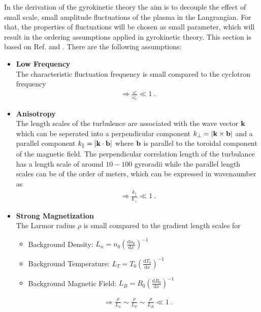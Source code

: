 In the derivation of the gyrokinetic theory the aim is to decouple the effect of small scale, small amplitude fluctuations of the plasma in the Langrangian. For that, the properties of fluctuations will be chosen as small parameter, which will result in the ordering assumptions applied in gyrokinetic theory. This section is based on Ref.   and . There are the following assumptions:

\begin{itemize}
	\item \textbf{Low Frequency}\\
		The characteristic fluctuation frequency is small compared to the cyclotron frequency 
		\begin{gather*}
			\Rightarrow \frac{\omega}{\omega_\mathrm{c}} \ll 1~.
		\end{gather*}
	\item \textbf{Anisotropy}\\
		The length scales of the turbulence are associated with the wave vector $\boldsymbol{\mathbf{k}}$ which can be seperated into a perpendicular component $k_\perp = |\boldsymbol{\mathbf{k}} \times \boldsymbol{\mathbf{b}}|$ and a parallel component $k_\parallel = |\boldsymbol{\mathbf{k}} \cdot \boldsymbol{\mathbf{b}}|$ where $\boldsymbol{\mathbf{b}}$ is parallel to the toroidal component of the magnetic field. The perpendicular correlation length of the turbulance has a length scale of around $10 - 100$ gyroradii while the parallel length scales can be of the order of meters, which can be expressed in wavenaumber as
		\begin{gather*}
			\Rightarrow \frac{k_\parallel}{k_\perp} \ll 1~.
		\end{gather*}
	\item \textbf{Strong Magnetization}\\
		The Larmor radius $\rho$ is small compared to the gradient length scales for
		\begin{itemize}
			\item Background Density: $L_n = n_0 \left(\frac{\mathrm{d}n_0}{\mathrm{d}x}\right)^{-1}$
			\item Background Temperature: $L_T = T_0 \left(\frac{\mathrm{d}T_0}{\mathrm{d}x}\right)^{-1}$
			\item Background Magnetic Field: $L_B = B_0 \left(\frac{\mathrm{d}B_0}{\mathrm{d}x}\right)^{-1}$
		\end{itemize}
		\begin{gather*}
			\Rightarrow \frac{\rho}{L_n} \sim \frac{\rho}{L_T} \sim \frac{\rho}{L_B}\ll 1~.
		\end{gather*}

\end{itemize}
